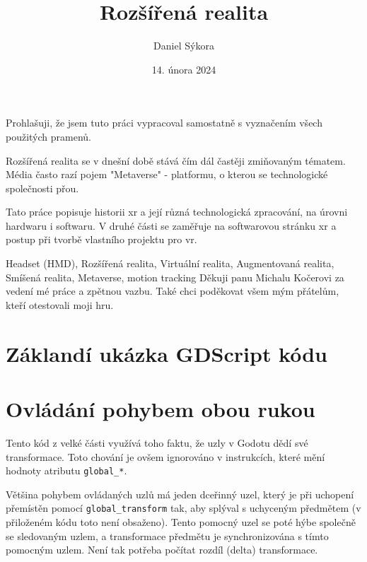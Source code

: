 \documentclass[12pt]{report}
\author{Daniel Sýkora}
\title{Rozšířená realita}
\date{14. února 2024}
\begin{document}
\mytitlepage
\prohlaseni
{
	Prohlašuji, že jsem tuto práci vypracoval samostatně s vyznačením všech použitých pramenů.
}
\abstrakt
{ %
	Rozšířená realita se v dnešní době stává čím dál častěji zmiňovaným tématem. Média často razí pojem "Metaverse" - platformu, o kterou se technologické společnosti přou.

	Tato práce popisuje historii \gls{xr} a její různá technologická zpracování, na úrovni hardwaru i softwaru. V druhé části se zaměřuje na softwarovou stránku \gls{xr} a postup při tvorbě vlastního projektu pro \gls{vr}.
}
{ %
	Headset (HMD), Rozšířená realita, Virtuální realita, Augmentovaná realita, Smíšená realita, Metaverse, motion tracking
}
\podekovani
{
	Děkuji panu Michalu Kočerovi za vedení mé práce a zpětnou vazbu. Také chci poděkovat všem mým přátelům, kteří otestovali moji hru.
}

\tableofcontents
\newpage






\nocite{*}

\printbibliography

\printglossary[title={Zkratky}]

\listoffigures
{}

\appendix
\chapter{Záklandí ukázka GDScript kódu}\label{apx_gscript_sample}

\chapter{Ovládání pohybem obou rukou}\label{apx_gripped_object_transformation}
Tento kód z velké části využívá toho faktu, že uzly v Godotu dědí své transformace. Toto chování je ovšem ignorováno v instrukcích, které mění hodnoty atributu \texttt{global\_*}.

Většina pohybem ovládaných uzlů má jeden dceřinný uzel, který je při uchopení přemístěn pomocí \texttt{global\_transform} tak, aby splýval s uchyceným předmětem (v přiloženém kódu toto není obsaženo). Tento pomocný uzel se poté hýbe společně se sledovaným uzlem, a transformace předmětu je synchronizována s tímto pomocným uzlem. Není tak potřeba počítat rozdíl (delta) transformace.


\end{document}
